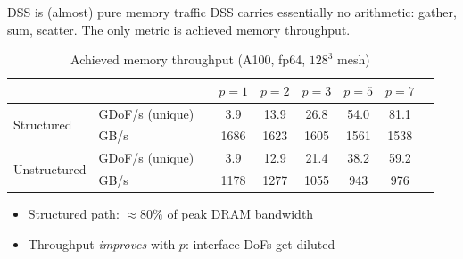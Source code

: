 \documentclass{beamer}
\begin{document}
\begin{frame}{DSS is (almost) pure memory traffic}
    DSS carries essentially \alert{no arithmetic}: gather, sum, scatter.
    The only metric is \alert{achieved memory throughput}.
    \begin{table}
        \centering
        \caption{Achieved memory throughput (A100, fp64, $128^3$ mesh)}
        \small
        \begin{tabular}{llccccccc}
            \toprule
            \multicolumn{2}{l}{} &                 & $p=1$ & $p=2$        & $p=3$ & $p=5$ & $p=7$                \\
            \midrule
            \multirow{2}{*}{Structured}
                                 & GDoF/s (unique) &       & 3.9          & 13.9  & 26.8  & 54.0  & 81.1         \\
                                 & GB/s            &       & \alert{1686} & 1623  & 1605  & 1561  & \alert{1538} \\
            \midrule
            \multirow{2}{*}{Unstructured}
                                 & GDoF/s (unique) &       & 3.9          & 12.9  & 21.4  & 38.2  & 59.2         \\
                                 & GB/s            &       & 1178         & 1277  & 1055  & 943   & 976          \\
            \bottomrule
        \end{tabular}
    \end{table}
    \begin{itemize}
        \item Structured path: $\approx 80\%$ of peak DRAM bandwidth
        \item Throughput \emph{improves} with $p$: interface DoFs get diluted
    \end{itemize}
\end{frame}
\end{document}

